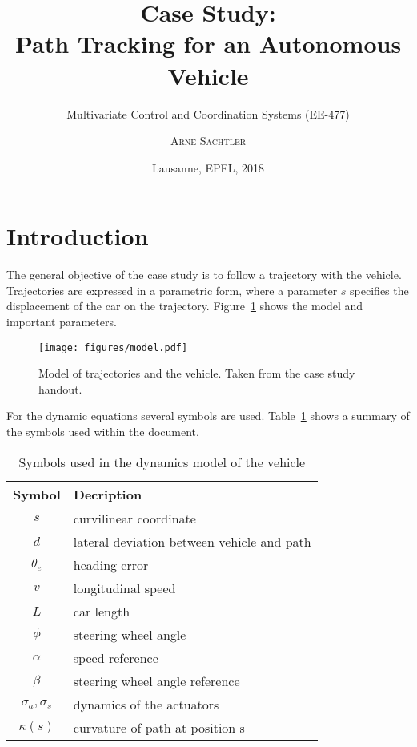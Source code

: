 \documentclass{scrartcl}
\title{Case Study:\\Path Tracking for an Autonomous Vehicle}
\subtitle{Multivariate Control and Coordination Systems (EE-477)}
\author{\textsc{Arne Sachtler}}
\date{Lausanne, EPFL, 2018}
\begin{document}
\maketitle
\tableofcontents

\setcounter{section}{-1}
\section{Introduction}
The general objective of the case study is to follow a trajectory with the vehicle.
Trajectories are expressed in a parametric form, where a parameter $s$ specifies the displacement of the car on the trajectory.
Figure~\ref{fig:vehicle_model} shows the model and important parameters.
\begin{figure}[h]
	\centering
	\texttt{[image: figures/model.pdf]}
	\caption{Model of trajectories and the vehicle. Taken from the case study handout.}
	\label{fig:vehicle_model}
\end{figure}
For the dynamic equations several symbols are used. 
Table~\ref{tab:symbols} shows a summary of the symbols used within the document.
\begin{table}[h]
	\centering
	\begin{tabular}{c|l}
	\hline
	\hline
	\textbf{Symbol} & \textbf{Decription}\\
	\hline
		 $s$ & curvilinear coordinate\\
		 $d$ & lateral deviation between vehicle and path\\
		 $\theta_e$ & heading error\\
		 $v$ & longitudinal speed\\
		 $L$ & car length\\
		 $\phi$ & steering wheel angle\\
		 $\alpha$ & speed reference\\
		 $\beta$ & steering wheel angle reference\\
		 $\sigma_a, \sigma_s$ & dynamics of the actuators\\
		 $\kappa(s)$ & curvature of path at position s\\
	\hline
	\hline
	\end{tabular}
	\caption{Symbols used in the dynamics model of the vehicle}
	\label{tab:symbols}
\end{table}
\end{document}
